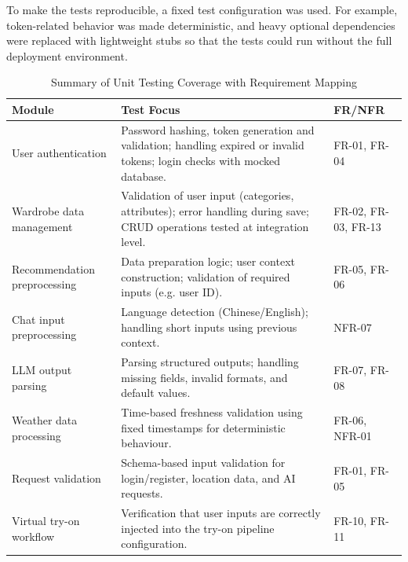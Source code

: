 To make the tests reproducible, a fixed test configuration was used. For example, token-related behavior was made deterministic, and heavy optional dependencies were replaced with lightweight stubs so that the tests could run without the full deployment environment.
\begin{table}[H]
\centering
\caption{Summary of Unit Testing Coverage with Requirement Mapping}
\label{unit_test_table}
\begin{tabular}{p{3.2cm} p{8.8cm} p{2.2cm}}
\toprule
\textbf{Module} & \textbf{Test Focus} & \textbf{FR/NFR} \\
\midrule

User authentication 
& Password hashing, token generation and validation; handling expired or invalid tokens; login checks with mocked database. 
& FR-01, FR-04 \\

\addlinespace

Wardrobe data management 
& Validation of user input (categories, attributes); error handling during save; CRUD operations tested at integration level. 
& FR-02, FR-03, FR-13 \\

\addlinespace

Recommendation preprocessing 
& Data preparation logic; user context construction; validation of required inputs (e.g. user ID). 
& FR-05, FR-06 \\

\addlinespace

Chat input preprocessing 
& Language detection (Chinese/English); handling short inputs using previous context. 
& NFR-07 \\

\addlinespace

LLM output parsing 
& Parsing structured outputs; handling missing fields, invalid formats, and default values. 
& FR-07, FR-08 \\

\addlinespace

Weather data processing 
& Time-based freshness validation using fixed timestamps for deterministic behaviour. 
& FR-06, NFR-01 \\

\addlinespace

Request validation 
& Schema-based input validation for login/register, location data, and AI requests. 
& FR-01, FR-05 \\

\addlinespace

Virtual try-on workflow 
& Verification that user inputs are correctly injected into the try-on pipeline configuration. 
& FR-10, FR-11 \\

\bottomrule
\end{tabular}
\end{table}

